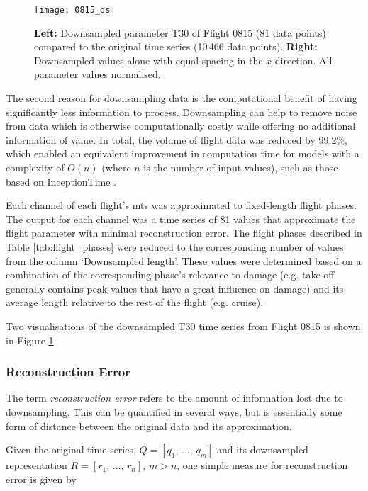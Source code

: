 \begin{figure}
    \centering
    \texttt{[image: 0815\_ds]}
    \caption{\label{fig:0815_ds} \textbf{Left:} Downsampled parameter T30 of Flight 0815 (81 data points) compared to the original time series (10\,466 data points). \textbf{Right:} Downsampled values alone with equal spacing in the \(x\)-direction. All parameter values normalised.}
\end{figure}

The second reason for downsampling data is the computational benefit of having significantly less information to process. Downsampling can help to remove noise from data which is otherwise computationally costly while offering no additional information of value. In total, the volume of flight data was reduced by 99.2\%, which enabled an equivalent improvement in computation time for models with a complexity of \(O(n)\) (where \(n\) is the number of input values), such as those based on InceptionTime \cite[]{fawaz_inceptiontime_2019}.

Each channel of each flight's \ac{mts} was approximated to fixed-length flight phases. The output for each channel was a time series of 81 values that approximate the flight parameter with minimal reconstruction error. The flight phases described in Table \ref{tab:flight_phases} were reduced to the corresponding number of values from the column `Downsampled length'. These values were determined based on a combination of the corresponding phase's relevance to damage (e.g. take-off generally contains peak values that have a great influence on damage) and its average length relative to the rest of the flight (e.g. cruise).

Two visualisations of the downsampled T30 time series from Flight 0815 is shown in Figure \ref{fig:0815_ds}.

\subsubsection{Reconstruction Error} \label{sec:recon_err}
The term \textit{reconstruction error} refers to the amount of information lost due to downsampling. This can be quantified in several ways, but is essentially some form of distance between the original data and its approximation.

Given the original time series, \(Q = \left[q_1,\,\ldots,\,q_m\right]\) and its downsampled representation \(R = \left[r_1,\,\ldots,\,r_n\right]\), \(m > n\), one simple measure for reconstruction error is given by

